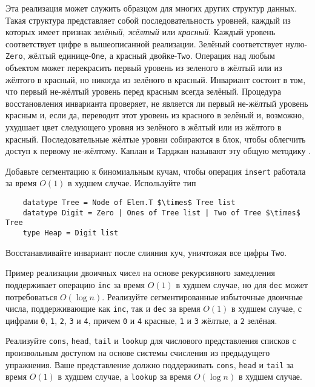 Эта реализация может служить образцом для многих других структур
данных. Такая структура представляет собой последовательность уровней,
каждый из которых имеет признак \emph{зелёный}, \emph{жёлтый} или
\emph{красный}. Каждый уровень 
соответствует цифре в вышеописанной реализации. Зелёный соответствует
нулю-\lstinline!Zero!, жёлтый единице-\lstinline!One!, а красный
двойке-\lstinline!Two!. Операция над любым объектом может перекрасить
первый уровень из зеленого в жёлтый или из жёлтого в красный, но
никогда из зелёного в красный. Инвариант состоит в том, что первый
не-жёлтый уровень перед красным всегда зелёный. Процедура
восстановления инварианта проверяет, не является ли первый не-жёлтый
уровень красным и, если да, переводит этот уровень из красного в
зелёный и, возможно, ухудшает цвет следующего уровня из зелёного в
жёлтый или из жёлтого в красный. Последовательные жёлтые уровни
собираются в блок, чтобы облегчить доступ к первому не-жёлтому. Каплан
и Тарджан \cite{KaplanTarjan1995} называют эту общую методику
.

\begin{exercise}\label{ex:9.11}
  Добавьте сегментацию к биномиальным кучам, чтобы операция
  \lstinline!insert! работала за время $O(1)$ в худшем
  случае. Используйте тип
  \begin{lstlisting}
    datatype Tree = Node of Elem.T $\times$ Tree list
    datatype Digit = Zero | Ones of Tree list | Two of Tree $\times$ Tree
    type Heap = Digit list
  \end{lstlisting}
  Восстанавливайте инвариант после слияния куч, уничтожая все цифры \lstinline!Two!.
\end{exercise}

\begin{exercise}\label{ex:9.12}
  Пример реализации двоичных чисел на основе рекурсивного замедления
  поддерживает операцию \lstinline!inc! за время $O(1)$ в худшем
  случае, но для \lstinline!dec! может потребоваться $O(\log
  n)$. Реализуйте сегментированные избыточные двоичные числа,
  поддерживающие как \lstinline!inc!, так и \lstinline!dec! за время
  $O(1)$ в худшем случае, с цифрами \texttt{0}, \texttt{1},
  \texttt{2}, \texttt{3} и \texttt{4}, причем \texttt{0} и \texttt{4}
  красные, \texttt{1} и \texttt{3} жёлтые, а \texttt{2} зелёная.
\end{exercise}

\begin{exercise}\label{ex:9.13}
  Реализуйте \lstinline!cons!, \lstinline!head!, \lstinline!tail! и
  \lstinline!lookup! для числового представления списков с
  произвольным доступом на основе системы счисления из предыдущего
  упражнения. Ваше представление должно поддерживать \lstinline!cons!,
  \lstinline!head! и \lstinline!tail! за время $O(1)$ в худшем случае,
  а \lstinline!lookup! за время $O(\log n)$ в худшем случае.
\end{exercise}

